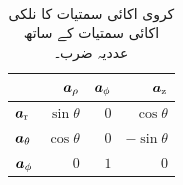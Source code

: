 \\
\begin{table}
\caption*{کروی  اکائی سمتیات کا نلکی اکائی سمتیات کے ساتھ عددیہ ضرب۔}
\centering
\begin{tabular}{l | r r r}
 & ${\boldsymbol{a}}_{\rho}$ & ${\boldsymbol{a}}_{\phi}$ & ${\boldsymbol{a}}_{\textup{z}}$ \\
\hline
${\boldsymbol{a}}_{\textup{r}}$ & $\sin \theta$ & $0$& $\cos \theta$\\
${\boldsymbol{a}}_{\theta}$ &$\cos \theta$ &$ 0$ &$ -\sin \theta$\\
${\boldsymbol{a}}_{\phi}$ & $0$ &$ 1$ &$0$
\end{tabular}
\end{table}

